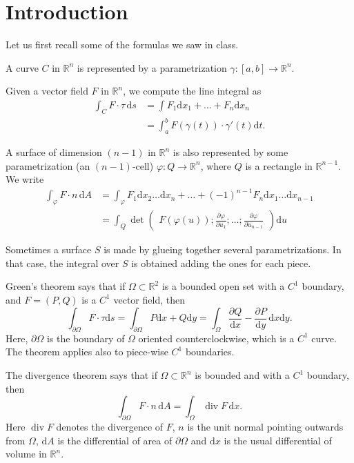 \documentclass{article}
\newcommand{\R}{\mathbb R}
\newcommand{\dd}{\mathrm d}
\DeclareMathOperator{\dv}{div}
\begin{document}
\section{Introduction}

Let us first recall some of the formulas we saw in class.

A curve $C$ in $\R^n$ is represented by a parametrization $\gamma : [a,b] \to \R^n$.

Given a vector field $F$ in $\R^n$, we compute the line integral as
\begin{align*}
\int_C F \cdot \tau \, \dd s &= \int F_1 \dd x_1 + \dots + F_n \dd x_n \\
&= \int_a^b F(\gamma(t)) \cdot \gamma'(t) \dd t.
\end{align*}

A surface of dimension $(n-1)$ in $\R^n$ is also represented by some parametrization (an $(n-1)$-cell) $\varphi : Q \to \R^n$, where $Q$ is a rectangle in $\R^{n-1}$. We write
\begin{align*} 
\int_\varphi F \cdot n \, \dd A &= \int_\varphi F_1 \dd x_2 \dots \dd x_n + \dots + (-1)^{n-1} F_n \dd x_1 \dots \dd x_{n-1} \\
&= \int_Q \det \begin{pmatrix} F(\varphi(u)) ; \frac{\partial \varphi}{\partial u_1} ; \dots ; \frac{\partial \varphi}{\partial u_{n-1}} \end{pmatrix} \dd u
\end{align*}

Sometimes a surface $S$ is made by glueing together several parametrizations. In that case, the integral over $S$ is obtained adding the ones for each piece.


Green's theorem says that if $\Omega \subset \R^2$ is a bounded open set with a $C^1$ boundary, and $F = (P,Q)$ is a $C^1$ vector field, then
\[ \int_{\partial \Omega} F \cdot \tau \dd s = \int_{\partial \Omega} P \dd x + Q \dd y =  \int_\Omega \frac{\partial Q}{\dd x} - \frac{\partial P}{\dd y} \, \dd x \dd y.\]
Here, ${\partial \Omega}$ is the boundary of $\Omega$ oriented counterclockwise, which is a $C^1$ curve. The theorem applies also to piece-wise $C^1$ boundaries.

The divergence theorem says that if $\Omega \subset \R^n$ is bounded and with a $C^1$ boundary, then
\[ \int_{\partial \Omega} F \cdot n \, \dd A = \int_\Omega \dv F \, \dd x.\]
Here $\dv F$ denotes the divergence of $F$, $n$ is the unit normal pointing outwards from $\Omega$, $\dd A$ is the differential of area of $\partial \Omega$ and $\dd x$ is the usual differential of volume in $\R^n$.
\end{document}
